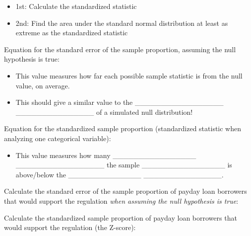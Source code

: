 \documentclass[
]{report}
\providecommand{\tightlist}{%
  \setlength{\itemsep}{0pt}\setlength{\parskip}{0pt}}
\begin{document}
\begin{itemize}
\item
  1st: Calculate the standardized statistic
\item
  2nd: Find the area under the standard normal distribution at least as extreme as the standardized statistic
\end{itemize}

Equation for the standard error of the sample proportion, assuming the null hypothesis is true:

\vspace{0.5in}


\begin{itemize}
\item
  This value measures how far each possible sample statistic is from the null value, on average.
\item
  This should give a similar value to the \_\_\_\_\_\_\_\_\_\_\_\_\_\_\_\_\_ \_\_\_\_\_\_\_\_\_\_\_\_\_\_\_ of a simulated null distribution!
\end{itemize}


\newpage

Equation for the standardized sample proportion (standardized statistic when analyzing one categorical variable):

\vspace{0.5in}


\begin{itemize}
\tightlist
\item
  This value measures how many \_\_\_\_\_\_\_\_\_\_\_\_\_\_\_\_ \_\_\_\_\_\_\_\_\_\_\_\_\_\_\_\_\_ the sample \_\_\_\_\_\_\_\_\_\_\_\_\_\_\_\_ is above/below the \_\_\_\_\_\_\_\_\_\_\_\_\_\_ \_\_\_\_\_\_\_\_\_\_\_\_\_\_\_.
\end{itemize}


Calculate the standard error of the sample proportion of payday loan borrowers that would support the regulation \emph{when assuming the null hypothesis is true}:

\vspace{0.3in}

Calculate the standardized sample proportion of payday loan borrowers that would support the regulation (the Z-score):

\vspace{0.5in}
\end{document}
